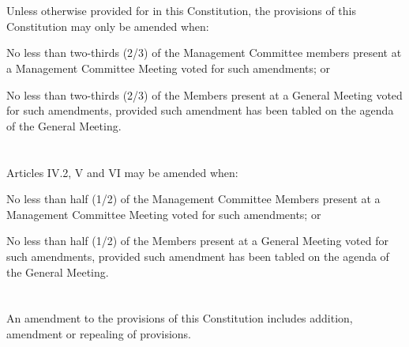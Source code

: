 
\section{}
Unless otherwise provided for in this Constitution, the provisions of this Constitution may only be amended when:
	\begin{legal}
	\item No less than two-thirds (2/3) of the Management Committee members present at a Management Committee Meeting voted for such amendments; or
	\item No less than two-thirds (2/3) of the Members present at a General Meeting voted for such amendments, provided such amendment has been tabled on the agenda of the General Meeting.
	\end{legal}

\section{}
Articles IV.2, V and VI may be amended when:
	\begin{legal}
	\item No less than half (1/2) of the Management Committee Members present at a Management Committee Meeting voted for such amendments; or
	\item No less than half (1/2) of the Members present at a General Meeting voted for such amendments, provided such amendment has been tabled on the agenda of the General Meeting.
	\end{legal}

\section{}
An amendment to the provisions of this Constitution includes addition, amendment or repealing of provisions.